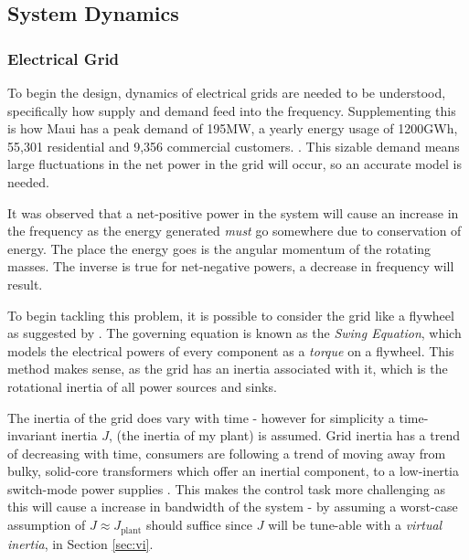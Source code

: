 \subsection{System Dynamics}
\label{sec:sysdyn}
\subsubsection{Electrical Grid}

To begin the design, dynamics of electrical grids are needed to be understood, specifically how supply and demand feed into the frequency.
Supplementing this is how Maui has a {peak demand of 195MW, a yearly energy usage of 1200GWh}, 55,301 residential and 9,356 commercial customers. \cite{power:maui}.
This sizable demand means large fluctuations in the net power in the grid will occur, so an accurate model is needed.

It was observed that a net-positive power in the system will cause an increase in the frequency as the energy generated \emph{must} go somewhere due to conservation of energy.
The place the energy goes is the angular momentum of the rotating masses.
The inverse is true for net-negative powers, a decrease in frequency will result.

To begin tackling this problem, it is possible to consider the grid like a flywheel as suggested by \cite{power:swing}.
The governing equation is known as the \emph{Swing Equation}, which models the electrical powers of every component as a \emph{torque} on a flywheel.
This method makes sense, as the grid has an inertia associated with it, which is the rotational inertia of all power sources and sinks.

The inertia of the grid does vary with time - however for simplicity a time-invariant inertia $J$, (the inertia of my plant) is assumed.
Grid inertia has a trend of decreasing with time, consumers are following a trend of moving away from bulky, solid-core transformers which offer an inertial component, to a low-inertia switch-mode power supplies \cite{power:vi}.
This makes the control task more challenging as this will cause a increase in bandwidth of the system - by assuming a worst-case assumption of $J \approx J_{\text{plant}}$ should suffice since $J$ will be tune-able with a \emph{virtual inertia}, in Section \ref{sec:vi}.

